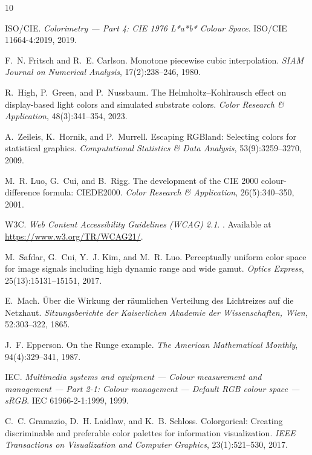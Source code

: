 \begin{thebibliography}{10}

ISO/CIE.
\newblock \emph{Colorimetry — Part 4: CIE 1976 L*a*b* Colour Space}.
\newblock ISO/CIE 11664-4:2019, 2019.

F.~N. Fritsch and R.~E. Carlson.
\newblock Monotone piecewise cubic interpolation.
\newblock \emph{SIAM Journal on Numerical Analysis}, 17(2):238--246, 1980.

R.~High, P.~Green, and P.~Nussbaum.
\newblock The Helmholtz--Kohlrausch effect on display-based light colors and
simulated substrate colors.
\newblock \emph{Color Research \& Application}, 48(3):341--354, 2023.

A.~Zeileis, K.~Hornik, and P.~Murrell.
\newblock Escaping RGBland: Selecting colors for statistical graphics.
\newblock \emph{Computational Statistics \& Data Analysis}, 53(9):3259--3270,
2009.

M.~R. Luo, G.~Cui, and B.~Rigg.
\newblock The development of the CIE 2000 colour-difference formula: CIEDE2000.
\newblock \emph{Color Research \& Application}, 26(5):340--350, 2001.

W3C.
\newblock \emph{Web Content Accessibility Guidelines (WCAG) 2.1}.
.
\newblock Available at \url{https://www.w3.org/TR/WCAG21/}.

M.~Safdar, G.~Cui, Y.~J. Kim, and M.~R. Luo.
\newblock Perceptually uniform color space for image signals including high
dynamic range and wide gamut.
\newblock \emph{Optics Express}, 25(13):15131--15151, 2017.

E.~Mach.
\newblock Über die Wirkung der räumlichen Verteilung des Lichtreizes auf die
Netzhaut.
\newblock \emph{Sitzungsberichte der Kaiserlichen Akademie der Wissenschaften,
Wien}, 52:303--322, 1865.

J.~F. Epperson.
\newblock On the Runge example.
\newblock \emph{The American Mathematical Monthly}, 94(4):329--341, 1987.

IEC.
\newblock \emph{Multimedia systems and equipment — Colour measurement and
management — Part 2-1: Colour management — Default RGB colour space — sRGB}.
\newblock IEC 61966-2-1:1999, 1999.

C.~C. Gramazio, D.~H. Laidlaw, and K.~B. Schloss.
\newblock Colorgorical: Creating discriminable and preferable color palettes for
information visualization.
\newblock \emph{IEEE Transactions on Visualization and Computer Graphics},
23(1):521--530, 2017.


\end{thebibliography}
